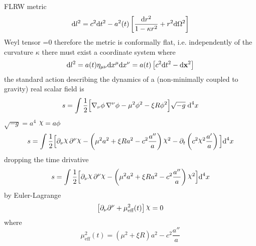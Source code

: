 \documentclass[pt=11, openany,twoside,a4paper]{scrbook}
\DeclareRobustCommand{\rchi}{{\mathpalette\irchi\relax}}
\newcommand{\irchi}[2]{\raisebox{\depth}{$#1\chi$}} %
\begin{document}
	
	\frontmatter
	
	\newpage
	\tableofcontents
	\newpage
	
	
	\mainmatter
	FLRW metric
	\begin{equation}
		\text{d} l^2 =c^2\text{d} t^2 -a^2(t)\left[\frac{\text{d} r^2}{1-\kappa r^2}+r^2\text{d}\Omega^2\right]
	\end{equation}
	Weyl tensor =0 therefore the metric is conformally flat, i.e. independently of the curvature $\kappa$ there must exist a coordinate system where 
	\begin{equation}
		\text{d} l^2=a(t)\eta_{\mu\nu}\text{d} x^\mu\text{d} x^\nu=a(t)\left[c^2\text{d} t^2-\text{d}\mathbf{x}^2\right]
	\end{equation}
	the standard action describing  the dynamics of a (non-minimally coupled to gravity) real scalar field is
	\begin{equation}
		s=\int\frac{1}{2}\Big[\nabla_\nu\phi\,\nabla^\nu\phi-\mu^2\phi^2-\xi R\phi^2\Big]\sqrt{-g}\;\text{d}^4 x
	\end{equation}
	$\sqrt{-g}=a^4$ $\rchi=a\phi$
	\begin{equation}
		s=\int\frac{1}{2}\Big[\partial_\nu\rchi\,\partial^\nu\rchi-\left(\mu^2a^2+\xi R a^2-c^2\frac{a''}{a}\right)\rchi^2-\partial_t\left(c^2\rchi^2\frac{a'}{a}\right)\Big]\td^4 x
	\end{equation}
	dropping the time drivative
	\begin{equation}
		s=\int\frac{1}{2}\Big[\partial_\nu\rchi\,\partial^\nu\rchi-\left(\mu^2a^2+\xi R a^2-c^2\frac{a''}{a}\right)\rchi^2\Big]\td^4 x
	\end{equation}
	by Euler-Lagrange
	\begin{equation}
		\left[\partial_\nu\partial^\nu+\mu_{\text{eff}}^2(t)\right]\rchi=0
	\end{equation}
	where
	\begin{equation}
		\mu_{\text{eff}}^2(t)=\left(\mu^2+\xi R\right)a^2-c^2\frac{a''}{a}
	\end{equation}
\end{document}
